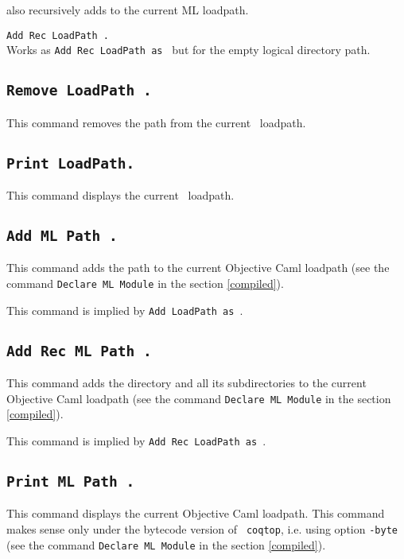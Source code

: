  also recursively adds {\str} to the current ML loadpath.

\begin{Variants}
\item {\tt Add Rec LoadPath {\str}.}\\
Works as {\tt Add Rec LoadPath {\str} as {\dirpath}} but for the empty logical directory path.
\end{Variants}

\subsection[\tt Remove LoadPath {\str}.]{\tt Remove LoadPath {\str}.}
This command removes the path {\str} from the current \Coq\ loadpath.

\subsection[\tt Print LoadPath.]{\tt Print LoadPath.}
This command displays the current \Coq\ loadpath.

\subsection[\tt Add ML Path {\str}.]{\tt Add ML Path {\str}.}
This command adds the path {\str} to the current Objective Caml loadpath (see
the command {\tt Declare ML Module} in the section \ref{compiled}).

\Rem This command is implied by {\tt Add LoadPath {\str} as {\dirpath}}.

\subsection[\tt Add Rec ML Path {\str}.]{\tt Add Rec ML Path {\str}.}
This command adds the directory {\str} and all its subdirectories 
to the current Objective Caml loadpath (see
the command {\tt Declare ML Module} in the section \ref{compiled}).

\Rem This command is implied by {\tt Add Rec LoadPath {\str} as {\dirpath}}.

\subsection[\tt Print ML Path {\str}.]{\tt Print ML Path {\str}.}
This command displays the current Objective Caml loadpath.
This command makes sense only under the bytecode version of {\tt
coqtop}, i.e. using option {\tt -byte} (see the
command {\tt Declare ML Module} in the section
\ref{compiled}).

